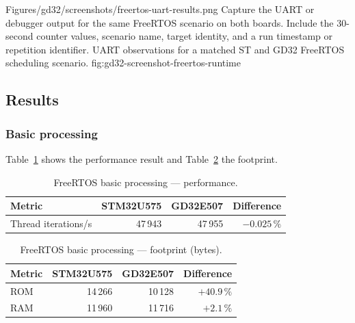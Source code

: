   \reportscreenshot
    {Figures/gd32/screenshots/freertos-uart-results.png}
    {Capture the UART or debugger output for the same FreeRTOS scenario on both boards. Include the 30-second counter values, scenario name, target identity, and a run timestamp or repetition identifier.}
    {UART observations for a matched ST and GD32 FreeRTOS scheduling scenario.}
    {fig:gd32-screenshot-freertos-runtime}

\subsection{Results}
\label{sec:gd32-freertos-results}

\subsubsection{Basic processing}
\label{sec:gd32-freertos-basic}

Table~\ref{tab:gd32-freertos-basic-perf} shows the performance result and
Table~\ref{tab:gd32-freertos-basic-fp} the footprint.

\begin{table}[H]
  \centering
  \caption{FreeRTOS basic processing --- performance.}
  \label{tab:gd32-freertos-basic-perf}
  \begin{tabular}{l r r r}
    \toprule
    \textbf{Metric} & \textbf{STM32U575} & \textbf{GD32E507} & \textbf{Difference} \\
    \midrule
    Thread iterations/s & 47\,943 & 47\,955 & $-0.025\,\%$ \\
    \bottomrule
  \end{tabular}
\end{table}

\begin{table}[H]
  \centering
  \caption{FreeRTOS basic processing --- footprint (bytes).}
  \label{tab:gd32-freertos-basic-fp}
  \begin{tabular}{l r r r}
    \toprule
    \textbf{Metric} & \textbf{STM32U575} & \textbf{GD32E507} & \textbf{Difference} \\
    \midrule
    ROM & 14\,266 & 10\,128 & $+40.9\,\%$ \\
    RAM & 11\,960 & 11\,716 & $+2.1\,\%$ \\
    \bottomrule
  \end{tabular}
\end{table}

